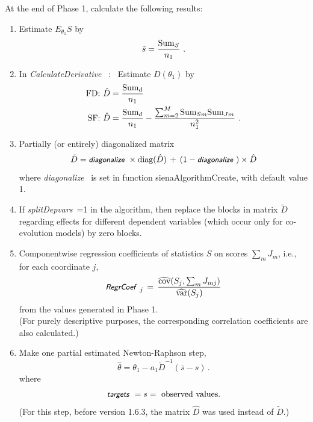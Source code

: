 \documentclass[a4paper,12pt,fleqn]{article}
\newcommand{\nm}[1]{\textsf{\small #1}}
\newcommand{\nnm}[1]{\textsf{\small\textit{#1}\ }}
\begin{document}
\begin{enumerate}
     At the end of Phase 1, calculate the following results:
      \begin{enumerate}
      \item
      Estimate $E_{\theta_1} S$  by
      \[
      \bar{s} = \frac{{\rm{Sum}}_{S}}{n_1} \ .
      \]
      \item In \nnm{CalculateDerivative} : \
      Estimate $D(\theta_1)$ by
      \begin{align*}
      \text{FD:    }   \hat{D} &= \frac{{\rm{Sum}}_{d}}{n_1} \\
      \text{SF:     }  \hat{D} &= \frac{{\rm{Sum}}_{d}}{n_1} -
                         \frac{\sum_{m=2}^M {\rm{Sum}}_{Sm}{\rm{Sum}}_{Jm}}{n_1^2} \ .
      \end{align*}
      \item Partially (or entirely) diagonalized matrix
      \[
         \tilde{D} = \nnm{diagonalize}\times\text{diag}(\hat{D})
               \,+\, (1-\nnm{diagonalize})\times \hat{D}
      \]
      where \nnm{diagonalize} is set in function \nm{sienaAlgorithmCreate},
      with default value 1.
      \item If \nnm{splitDepvars}=1 in the algorithm, then replace the
        blocks in matrix $ \tilde{D}$ regarding effects for different dependent
        variables (which occur only for co-evolution models) by zero blocks.
      \item Componentwise regression coefficients of statistics $S$ on scores
            $\sum_m J_m$, i.e., for each coordinate $j$,
            \[
            \nnm{RegrCoef}_j \,=\, \frac{\widehat{\text{cov}}(S_j, \sum_m J_{mj})}
                                   {\widehat{\text{var}}(S_j)}
            \]
            from the values generated in Phase 1.\\
            (For purely descriptive purposes, the corresponding correlation
            coefficients are also calculated.)
      \item Make one partial estimated Newton-Raphson step,
      \[
       {\hat{\theta}} = \theta_1 -
         a_1 {\tilde{D}}^{-1} \left( \bar{s} - s \right)\, .
      \]
      where
      \[
      \nnm{targets} = s = \text{ observed values} .
      \]
      (For this step, before version 1.6.3, the matrix $\hat{D}$ was used
      instead of $\tilde{D}$.)
      \end{enumerate}
      \medskip


\end{enumerate}
\end{document}
